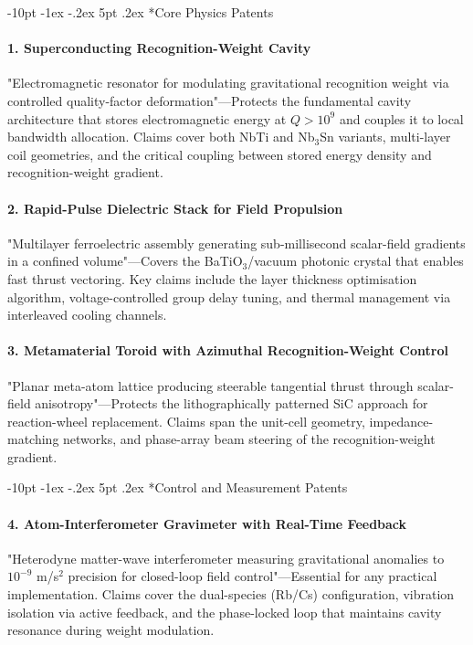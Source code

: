\documentclass[12pt,letterpaper]{book}
\makeatletter
\renewcommand\section{\@startsection {section}{1}{\z@}%
                {-10pt \@plus -1ex \@minus -.2ex}%
                {5pt \@plus.2ex}%
                {\normalfont\large\bfseries}}
\makeatother
\begin{document}
\section*{Core Physics Patents}

\paragraph{1. Superconducting Recognition-Weight Cavity}
"Electromagnetic resonator for modulating gravitational recognition weight via controlled quality-factor deformation"—Protects the fundamental cavity architecture that stores electromagnetic energy at $Q>10^9$ and couples it to local bandwidth allocation.  Claims cover both NbTi and Nb$_3$Sn variants, multi-layer coil geometries, and the critical coupling between stored energy density and recognition-weight gradient.

\paragraph{2. Rapid-Pulse Dielectric Stack for Field Propulsion}
"Multilayer ferroelectric assembly generating sub-millisecond scalar-field gradients in a confined volume"—Covers the BaTiO$_3$/vacuum photonic crystal that enables fast thrust vectoring.  Key claims include the layer thickness optimisation algorithm, voltage-controlled group delay tuning, and thermal management via interleaved cooling channels.

\paragraph{3. Metamaterial Toroid with Azimuthal Recognition-Weight Control}
"Planar meta-atom lattice producing steerable tangential thrust through scalar-field anisotropy"—Protects the lithographically patterned SiC approach for reaction-wheel replacement.  Claims span the unit-cell geometry, impedance-matching networks, and phase-array beam steering of the recognition-weight gradient.

\section*{Control and Measurement Patents}

\paragraph{4. Atom-Interferometer Gravimeter with Real-Time Feedback}
"Heterodyne matter-wave interferometer measuring gravitational anomalies to $10^{-9}$ m/s$^2$ precision for closed-loop field control"—Essential for any practical implementation.  Claims cover the dual-species (Rb/Cs) configuration, vibration isolation via active feedback, and the phase-locked loop that maintains cavity resonance during weight modulation.
\end{document}
